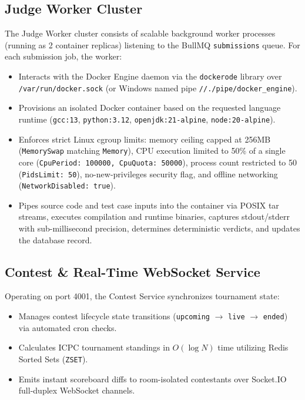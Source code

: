 \documentclass[12pt,a4paper]{report}
\begin{document}
\subsection{Judge Worker Cluster}
The Judge Worker cluster consists of scalable background worker processes (running as 2 container replicas) listening to the BullMQ \texttt{submissions} queue. For each submission job, the worker:
\begin{itemize}[leftmargin=*]
  \item Interacts with the Docker Engine daemon via the \texttt{dockerode} library over \texttt{/var/run/docker.sock} (or Windows named pipe \texttt{//./pipe/docker\_engine}).
  \item Provisions an isolated Docker container based on the requested language runtime (\texttt{gcc:13}, \texttt{python:3.12}, \texttt{openjdk:21-alpine}, \texttt{node:20-alpine}).
  \item Enforces strict Linux cgroup limits: memory ceiling capped at 256MB (\texttt{MemorySwap} matching \texttt{Memory}), CPU execution limited to 50\% of a single core (\texttt{CpuPeriod: 100000, CpuQuota: 50000}), process count restricted to 50 (\texttt{PidsLimit: 50}), no-new-privileges security flag, and offline networking (\texttt{NetworkDisabled: true}).
  \item Pipes source code and test case inputs into the container via POSIX tar streams, executes compilation and runtime binaries, captures stdout/stderr with sub-millisecond precision, determines deterministic verdicts, and updates the database record.
\end{itemize}

\subsection{Contest \& Real-Time WebSocket Service}
Operating on port 4001, the Contest Service synchronizes tournament state:
\begin{itemize}[leftmargin=*]
  \item Manages contest lifecycle state transitions (\texttt{upcoming} $\to$ \texttt{live} $\to$ \texttt{ended}) via automated cron checks.
  \item Calculates ICPC tournament standings in $O(\log N)$ time utilizing Redis Sorted Sets (\texttt{ZSET}).
  \item Emits instant scoreboard diffs to room-isolated contestants over Socket.IO full-duplex WebSocket channels.
\end{itemize}
\end{document}
